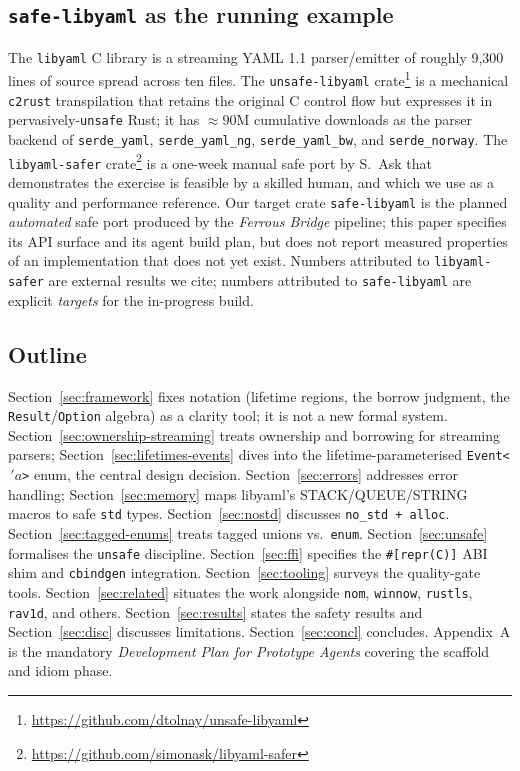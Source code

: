 \documentclass[12pt]{article}
\theoremstyle{definition}
\theoremstyle{remark}
\newcommand{\lifetime}[1]{\ensuremath{\,'\!#1}}
\begin{document}
\subsection{\texttt{safe-libyaml} as the running example}

The \texttt{libyaml} C library is a streaming YAML 1.1 parser/emitter of
roughly 9{,}300 lines of source spread across ten files. The
\texttt{unsafe-libyaml} crate\footnote{\url{https://github.com/dtolnay/unsafe-libyaml}}
is a mechanical \texttt{c2rust} transpilation that retains the original C
control flow but expresses it in pervasively-\texttt{unsafe} Rust; it has
$\approx 90$M cumulative downloads as the parser backend of
\texttt{serde\_yaml}, \texttt{serde\_yaml\_ng}, \texttt{serde\_yaml\_bw}, and
\texttt{serde\_norway}. The \texttt{libyaml-safer}
crate\footnote{\url{https://github.com/simonask/libyaml-safer}} is a one-week
manual safe port by S.\ Ask that demonstrates the exercise is feasible by a
skilled human, and which we use as a quality and performance reference. Our
target crate \texttt{safe-libyaml} is the planned \emph{automated} safe
port produced by the \emph{Ferrous Bridge} pipeline; this paper specifies
its API surface and its agent build plan, but does not report measured
properties of an implementation that does not yet exist. Numbers attributed
to \texttt{libyaml-safer} are external results we cite; numbers attributed
to \texttt{safe-libyaml} are explicit \emph{targets} for the in-progress
build.

\subsection{Outline}

Section~\ref{sec:framework} fixes notation (lifetime regions, the borrow
judgment, the \texttt{Result}/\texttt{Option} algebra) as a clarity tool;
it is not a new formal system.
Section~\ref{sec:ownership-streaming} treats ownership and borrowing for
streaming parsers; Section~\ref{sec:lifetimes-events} dives into the
lifetime-parameterised \texttt{Event<\lifetime{a}>} enum, the central design
decision. Section~\ref{sec:errors} addresses error handling;
Section~\ref{sec:memory} maps libyaml's STACK/QUEUE/STRING macros to safe
\texttt{std} types. Section~\ref{sec:nostd} discusses \texttt{no\_std + alloc}.
Section~\ref{sec:tagged-enums} treats tagged unions vs.\ \texttt{enum}.
Section~\ref{sec:unsafe} formalises the \texttt{unsafe} discipline.
Section~\ref{sec:ffi} specifies the \texttt{\#[repr(C)]} ABI shim and
\texttt{cbindgen} integration. Section~\ref{sec:tooling} surveys the
quality-gate tools. Section~\ref{sec:related} situates the work alongside
\texttt{nom}, \texttt{winnow}, \texttt{rustls}, \texttt{rav1d}, and others.
Section~\ref{sec:results} states the safety results and Section~\ref{sec:disc}
discusses limitations. Section~\ref{sec:concl} concludes.
Appendix~A is the mandatory \emph{Development Plan for Prototype Agents}
covering the scaffold and idiom phase.
\end{document}
